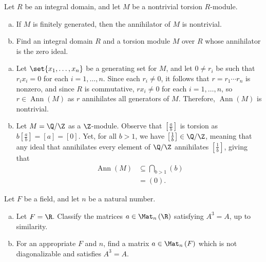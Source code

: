 \documentclass[10pt]{mypackage}
\begin{document}
\begin{problem}[Problem 4]
  Let $R$ be an integral domain, and let $M$ be a nontrivial torsion $R$-module.
  \begin{enumerate}[(a)]
    \item If $M$ is finitely generated, then the annihilator of $M$ is nontrivial.
    \item Find an integral domain $R$ and a torsion module $M$ over $R$ whose annihilator is the zero ideal.
  \end{enumerate}
\end{problem}
\begin{solution}\hfill
  \begin{enumerate}[(a)]
    \item Let $\set{x_1,\dots,x_n}$ be a generating set for $M$, and let $0\neq r_i$ be such that $r_ix_i = 0$ for each $i=1,\dots,n$. Since each $r_i\neq 0$, it follows that $r = r_1\cdots r_n$ is nonzero, and since $R$ is commutative, $rx_i\neq 0$ for each $i=1,\dots,n$, so $r\in \operatorname{Ann}\left( M \right)$ as $r$ annihilates all generators of $M$. Therefore, $ \operatorname{Ann}(M) $ is nontrivial.
    \item Let $M = \Q/\Z$ as a $\Z$-module. Observe that $\left[ \frac{a}{b} \right]$ is torsion as $ b \left[ \frac{a}{b} \right] = \left[ a \right] = \left[ 0 \right] $. Yet, for all $b > 1$, we have $\left[ \frac{1}{b} \right]\in \Q/\Z$, meaning that any ideal that annihilates every element of $\Q/\Z$ annihilates $\left[ \frac{1}{b} \right]$, giving that
      \begin{align*}
        \operatorname{Ann}\left( M \right) &\subseteq \bigcap_{b > 1} \left( b \right)\\
                                           &= \left( 0 \right).
      \end{align*}
  \end{enumerate}
\end{solution}
\begin{problem}[Problem 5]
  Let $F$ be a field, and let $n$ be a natural number.
  \begin{enumerate}[(a)]
    \item Let $F = \R$. Classify the matrices $a\in \Mat_n\left( \R \right)$ satisfying $A^3 = A$, up to similarity.
    \item For an appropriate $F$ and $n$, find a matrix $a\in \Mat_n\left( F \right)$ which is not diagonalizable and satisfies $A^3 = A$.
  \end{enumerate}
\end{problem}
\end{document}
